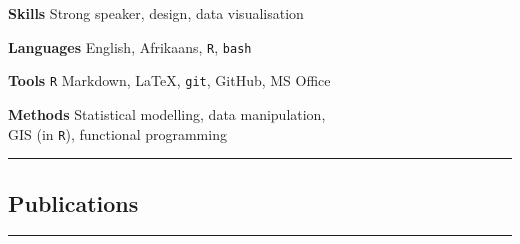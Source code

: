 \documentclass[10pt]{article}
\begin{document}


\begin{multicols}{2} %



\columnbreak

\textbf{Skills   }     \hfill      Strong speaker, design, data visualisation

\textbf{Languages}     \hfill   English, Afrikaans, \texttt{R}, \texttt{bash}

\textbf{Tools    }     \hfill                            \texttt{R} Markdown,
                                        {\selectfont \LaTeX},
                                              \texttt{git}, GitHub, MS Office

\textbf{Methods  }     \hfill       Statistical modelling, data manipulation, \\
                       \hfill     GIS (in \texttt{R}), functional programming

\end{multicols} %

\hrule

\subsection*{Publications} %



\vskip10pt

\hrule
\end{document}
